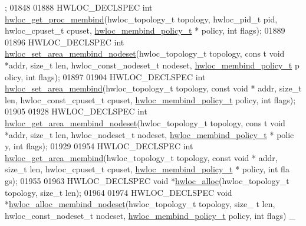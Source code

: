 \begin{DoxyCode}
      ;
01848 
01888 HWLOC\_DECLSPEC \textcolor{keywordtype}{int} \hyperlink{a00050_gabaf9c13f1fa301d6895594cec52226e2}{hwloc_get_proc_membind}(hwloc\_topology\_t topology, hwloc\_pid\_t 
      pid, hwloc\_cpuset\_t cpuset, \hyperlink{a00050_gac9764f79505775d06407b40f5e4661e8}{hwloc_membind_policy_t} * policy, \textcolor{keywordtype}{int} flags);
01889 
01896 HWLOC\_DECLSPEC \textcolor{keywordtype}{int} \hyperlink{a00050_gade5e2c28ea8475a479bf2b1df36c6ccd}{hwloc_set_area_membind_nodeset}(hwloc\_topology\_t topology, \textcolor{keyword}{cons
      t} \textcolor{keywordtype}{void} *addr, \textcolor{keywordtype}{size\_t} len, hwloc\_const\_nodeset\_t nodeset, \hyperlink{a00050_gac9764f79505775d06407b40f5e4661e8}{hwloc_membind_policy_t} p
      olicy, \textcolor{keywordtype}{int} flags);
01897 
01904 HWLOC\_DECLSPEC \textcolor{keywordtype}{int} \hyperlink{a00050_ga06594edeb4728cb9e014aed924d1e74a}{hwloc_set_area_membind}(hwloc\_topology\_t topology, \textcolor{keyword}{const} \textcolor{keywordtype}{void} *
      addr, \textcolor{keywordtype}{size\_t} len, hwloc\_const\_cpuset\_t cpuset, \hyperlink{a00050_gac9764f79505775d06407b40f5e4661e8}{hwloc_membind_policy_t} policy, \textcolor{keywordtype}{int
      } flags);
01905 
01928 HWLOC\_DECLSPEC \textcolor{keywordtype}{int} \hyperlink{a00050_ga106e6fcd764d17be682faf7a5bc95720}{hwloc_get_area_membind_nodeset}(hwloc\_topology\_t topology, \textcolor{keyword}{cons
      t} \textcolor{keywordtype}{void} *addr, \textcolor{keywordtype}{size\_t} len, hwloc\_nodeset\_t nodeset, \hyperlink{a00050_gac9764f79505775d06407b40f5e4661e8}{hwloc_membind_policy_t} * polic
      y, \textcolor{keywordtype}{int} flags);
01929 
01954 HWLOC\_DECLSPEC \textcolor{keywordtype}{int} \hyperlink{a00050_gac02ee8f7606382ea7855ae4e1656ed0f}{hwloc_get_area_membind}(hwloc\_topology\_t topology, \textcolor{keyword}{const} \textcolor{keywordtype}{void} *
      addr, \textcolor{keywordtype}{size\_t} len, hwloc\_cpuset\_t cpuset, \hyperlink{a00050_gac9764f79505775d06407b40f5e4661e8}{hwloc_membind_policy_t} * policy, \textcolor{keywordtype}{int} fla
      gs);
01955 
01963 HWLOC\_DECLSPEC \textcolor{keywordtype}{void} *\hyperlink{a00050_gac5586e58cf25c3596b7d4aa31ce13259}{hwloc_alloc}(hwloc\_topology\_t topology, \textcolor{keywordtype}{size\_t} len);
01964 
01974 HWLOC\_DECLSPEC \textcolor{keywordtype}{void} *\hyperlink{a00050_gaeaa00714a9c4319bda0a74ca6f8720e8}{hwloc_alloc_membind_nodeset}(hwloc\_topology\_t topology, \textcolor{keywordtype}{size\_
      t} len, hwloc\_const\_nodeset\_t nodeset, \hyperlink{a00050_gac9764f79505775d06407b40f5e4661e8}{hwloc_membind_policy_t} policy, \textcolor{keywordtype}{int} flags) \_

\end{DoxyCode}
